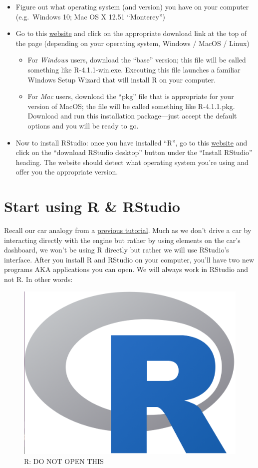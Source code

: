 \documentclass[
]{book}
\providecommand{\tightlist}{%
  \setlength{\itemsep}{0pt}\setlength{\parskip}{0pt}}
\begin{document}
\begin{itemize}
\tightlist
\item
  Figure out what operating system (and version) you have on your computer (e.g.~Windows 10; Mac OS X 12.51 ``Monterey'')\\
\item
  Go to this \href{https://cran.r-project.org/}{website} and click on the appropriate download link at the top of the page (depending on your operating system, Windows / MacOS / Linux)

  \begin{itemize}
  \tightlist
  \item
    For \emph{Windows} users, download the ``base'' version; this file will be called something like R-4.1.1-win.exe. Executing this file launches a familiar Windows Setup Wizard that will install R on your computer.\\
  \item
    For \emph{Mac} users, download the ``pkg'' file that is appropriate for your version of MacOS; the file will be called something like R-4.1.1.pkg. Download and run this installation package---just accept the default options and you will be ready to go.
  \end{itemize}
\item
  Now to install RStudio: once you have installed ``R'', go to this \href{https://posit.co/download/rstudio-desktop/}{website} and click on the ``download RStudio desktop'' button under the ``Install RStudio'' heading. The website should detect what operating system you're using and offer you the appropriate version.
\end{itemize}

\chapter{Start using R \& RStudio}\label{start_r}

Recall our car analogy from a \hyperref[what_is_R]{previous tutorial}. Much as we don't drive a car by interacting directly with the engine but rather by using elements on the car's dashboard, we won't be using R directly but rather we will use RStudio's interface. After you install R and RStudio on your computer, you'll have two new programs AKA applications you can open. We will always work in RStudio and not R. In other words:

\begin{figure}
\includegraphics[width=0.3\linewidth]{./more/Rlogo} \caption{R: DO NOT OPEN THIS}\label{fig:unnamed-chunk-4}
\end{figure}
\end{document}
